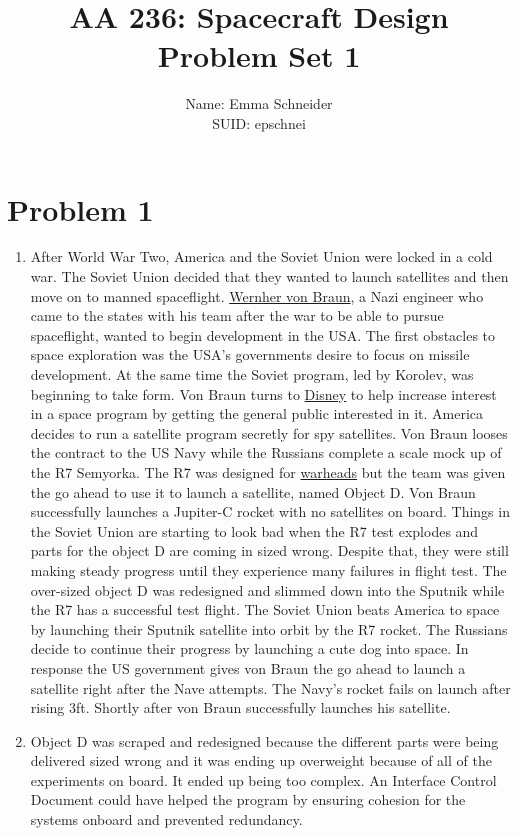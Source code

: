 \documentclass{article}
\title{AA 236: Spacecraft Design \\ Problem Set 1}
\author{Name: Emma Schneider \\ SUID: epschnei}
\date{}
\begin{document}
\maketitle
\pagestyle{fancy} 

\section*{Problem 1}
\begin{enumerate}[label=(\alph*)]
\item After World War Two, America and the Soviet Union were locked in a cold war. The Soviet Union decided that they wanted to launch satellites and then move on to manned spaceflight. \href{https://www.youtube.com/watch?v=TjDEsGZLbio}{Wernher von Braun}, a Nazi engineer who came to the states with his team after the war to be able to pursue spaceflight, wanted to begin development in the USA. 
The first obstacles to space exploration was the USA's governments desire to focus on missile development. At the same time the Soviet program, led by Korolev, was beginning to take form. Von Braun turns to \href{https://www.youtube.com/watch?v=8zcU85O82XE}{Disney} to help increase interest in a space program by getting the general public interested in it. America decides to run a satellite program secretly for spy satellites. Von Braun looses the contract to the US Navy while the Russians complete a scale mock up of the R7 Semyorka. 
The R7 was designed for \href{https://www.youtube.com/watch?v=IKqXu-5jw60}{warheads} but the team was given the go ahead to use it to launch a satellite, named Object D. Von Braun successfully launches a Jupiter-C rocket with no satellites on board. Things in the Soviet Union are starting to look bad when the R7 test explodes and parts for the object D are coming in sized wrong. Despite that, they were still making steady progress until they experience many failures in flight test. The over-sized object D was redesigned and slimmed down into the Sputnik while the R7 has a successful test flight. 
The Soviet Union beats America to space by launching their Sputnik satellite into orbit by the R7 rocket. The Russians decide to continue their progress by launching a cute dog into space. In response the US government gives von Braun the go ahead to launch a satellite right after the Nave attempts. The Navy's rocket fails on launch after rising 3ft. Shortly after von Braun successfully launches his satellite.
 
\item Object D was scraped and redesigned because the different parts were being delivered sized wrong and it was ending up overweight because of all of the experiments on board. It ended up being too complex.  An Interface Control Document could have helped the program by ensuring cohesion for the systems onboard and prevented redundancy.


\end{enumerate}
\end{document}
